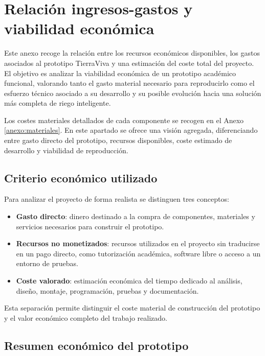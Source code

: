 \chapter{Relación ingresos-gastos y viabilidad económica}
\label{anexo:relacion_ingresos_gastos}

Este anexo recoge la relación entre los recursos económicos disponibles, los gastos asociados al prototipo TierraViva y una estimación del coste total del proyecto. El objetivo es analizar la viabilidad económica de un prototipo académico funcional, valorando tanto el gasto material necesario para reproducirlo como el esfuerzo técnico asociado a su desarrollo y su posible evolución hacia una solución más completa de riego inteligente.

Los costes materiales detallados de cada componente se recogen en el Anexo \ref{anexo:materiales}. En este apartado se ofrece una visión agregada, diferenciando entre gasto directo del prototipo, recursos disponibles, coste estimado de desarrollo y viabilidad de reproducción.

\section{Criterio económico utilizado}

Para analizar el proyecto de forma realista se distinguen tres conceptos:

\begin{itemize}
    \item \textbf{Gasto directo}: dinero destinado a la compra de componentes, materiales y servicios necesarios para construir el prototipo.
    \item \textbf{Recursos no monetizados}: recursos utilizados en el proyecto sin traducirse en un pago directo, como tutorización académica, software libre o acceso a un entorno de pruebas.
    \item \textbf{Coste valorado}: estimación económica del tiempo dedicado al análisis, diseño, montaje, programación, pruebas y documentación.
\end{itemize}

Esta separación permite distinguir el coste material de construcción del prototipo y el valor económico completo del trabajo realizado.

\section{Resumen económico del prototipo}

